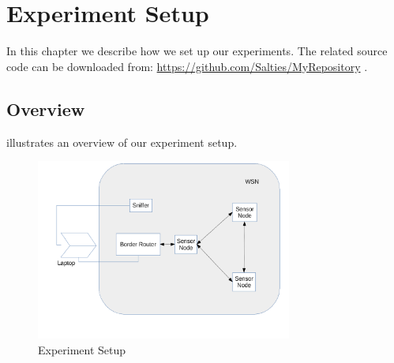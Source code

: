 \chapter{Experiment Setup} \label{Chp: Experiment Setup}

In this chapter we describe how we set up our experiments. The related source code can be downloaded from: \url{https://github.com/Salties/MyRepository} .

\section{Overview}

 illustrates an overview of our experiment setup. 

\begin{figure}[h!]
	\center
	\includegraphics[width=0.75\textwidth,]{fig/setup.png}
	\caption{Experiment Setup} \label{Fig: Experiment Setup}
\end{figure}

